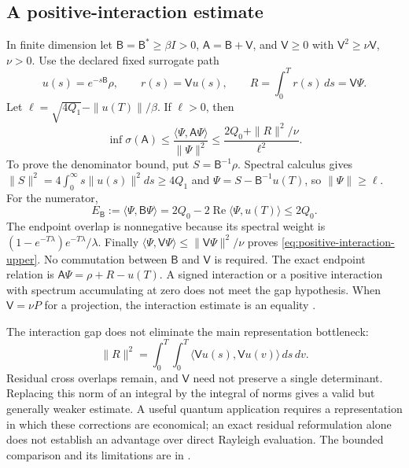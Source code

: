 \documentclass[11pt]{article}
\numberwithin{equation}{section}
\theoremstyle{definition}
\theoremstyle{remark}
\begin{document}
\subsection{A positive-interaction estimate}
In finite dimension let $\mathsf B=\mathsf B^*\ge\beta I>0$,
$\mathsf A=\mathsf B+\mathsf V$, and $\mathsf V\ge0$ with
$\mathsf V^2\ge\nu\mathsf V$, $\nu>0$.  Use the declared fixed
surrogate path
\begin{equation}
 u(s)=e^{-s\mathsf B}\rho,\qquad
 r(s)=\mathsf V u(s),\qquad
 R=\int_0^Tr(s)\,ds=\mathsf V\Psi.
\end{equation}
Let $\ell=\sqrt{4Q_1}-\|u(T)\|/\beta$.  If $\ell>0$, then
\begin{equation}\label{eq:positive-interaction-upper}
 \inf\sigma(\mathsf A)\le\frac{\langle\Psi,\mathsf A\Psi\rangle}
 {\|\Psi\|^2}
 \le\frac{2Q_0+\|R\|^2/\nu}{\ell^2}.
\end{equation}
To prove the denominator bound, put $S=\mathsf B^{-1}\rho$.
Spectral calculus gives
$\|S\|^2=4\int_0^\infty s\|u(s)\|^2ds\ge4Q_1$ and
$\Psi=S-\mathsf B^{-1}u(T)$, so $\|\Psi\|\ge\ell$.
For the numerator,
\begin{equation}
 E_{\mathsf B}:=\langle\Psi,\mathsf B\Psi\rangle
 =2Q_0-2\operatorname{Re}\langle\Psi,u(T)\rangle\le2Q_0.
\end{equation}
The endpoint overlap is nonnegative because its spectral weight is
$(1-e^{-T\lambda})e^{-T\lambda}/\lambda$.  Finally
$\langle\Psi,\mathsf V\Psi\rangle\le\|\mathsf V\Psi\|^2/\nu$
proves \eqref{eq:positive-interaction-upper}.  No commutation between
$\mathsf B$ and $\mathsf V$ is required.  The exact endpoint relation
is $\mathsf A\Psi=\rho+R-u(T)$.  A signed interaction or a positive
interaction with spectrum accumulating at zero does not meet the gap
hypothesis.  When $\mathsf V=\nu P$ for a projection, the interaction
estimate is an equality \cite{hubbardnote}.

The interaction gap does not eliminate the main representation
bottleneck:
\begin{equation}\label{eq:residual-cross-kernel}
 \|R\|^2=\int_0^T\!\int_0^T
 \langle\mathsf V u(s),\mathsf V u(v)\rangle\,ds\,dv.
\end{equation}
Residual cross overlaps remain, and $\mathsf V$ need not preserve
a single determinant.  Replacing this norm of an integral by the
integral of norms gives a valid but generally weaker estimate.  A
useful quantum application requires a representation in which these
corrections are economical; an exact residual reformulation alone
does not establish an advantage over direct Rayleigh evaluation.
The bounded comparison and its limitations are in \cite{hubbardnote}.
\end{document}
